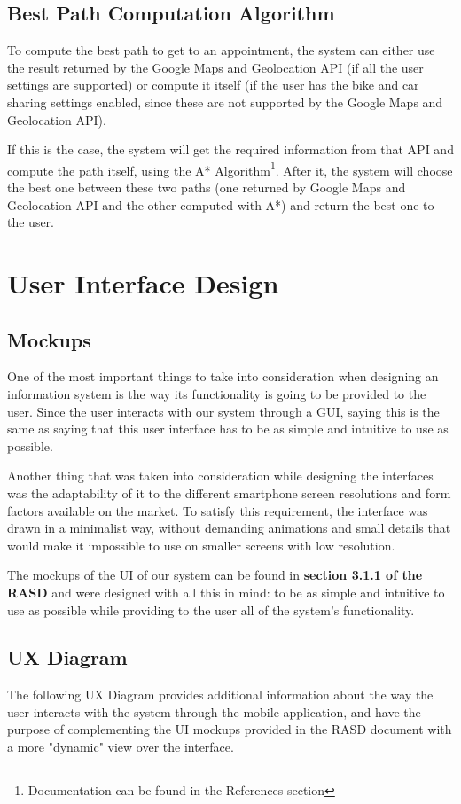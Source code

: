 \documentclass[12pt]{article}
\begin{document}
\subsection{Best Path Computation Algorithm}
To compute the best path to get to an appointment, the system can either use the result returned by the Google Maps and Geolocation API (if all the user settings are supported) or compute it itself (if the user has the bike and car sharing settings enabled, since these are not supported by the Google Maps and Geolocation API). 

If this is the case, the system will get the required information from that API and compute the path itself, using the A* Algorithm\footnote{Documentation can be found in the References section}.
After it, the system will choose the best one between these two paths (one returned by Google Maps and Geolocation API and the other computed with A*) and return the best one to the user.

\section{User Interface Design}
\subsection{Mockups}
One of the most important things to take into consideration when designing an information system is the way its functionality is going to be provided to the user. Since the user interacts with our system through a GUI, saying this is the same as saying that this user interface has to be as simple and intuitive to use as possible.

Another thing that was taken into consideration while designing the interfaces was the adaptability of it to the different smartphone screen resolutions and form factors available on the market. To satisfy this requirement, the interface was drawn in a minimalist way, without demanding animations and small details that would make it impossible to use on smaller screens with low resolution.

The mockups of the UI of our system can be found in \textbf{section 3.1.1 of the RASD} and were designed with all this in mind: to be as simple and intuitive to use as possible while providing to the user all of the system's functionality.

\subsection{UX Diagram}
The following UX Diagram provides additional information about the way the user interacts with the system through the mobile application, and have the purpose of complementing the UI mockups provided in the RASD document with a more "dynamic" view over the interface.
\end{document}
